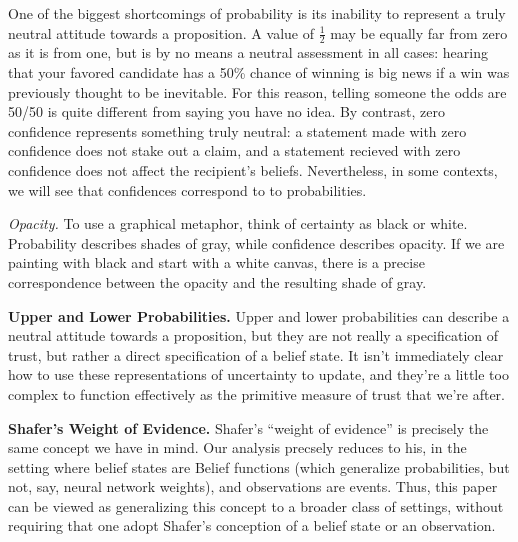 One of the biggest shortcomings of probability is its inability to represent a truly neutral attitude towards a proposition.
A value of $\frac12$ may be equally far from zero as it is from one, but is by no means a neutral assessment in all cases: hearing that your favored candidate has a 50\% chance of winning is big news if a win was previously thought to be inevitable.
For this reason, telling someone the odds are 50/50 is quite different from saying you have no idea.
By contrast, zero confidence represents something truly neutral:
	a statement made with zero confidence does not stake out a claim, and
	a statement recieved with zero confidence does not affect the recipient's beliefs.
Nevertheless, in some contexts, we will see that confidences correspond to to probabilities.

\textit{Opacity.} To use a graphical metaphor, think of certainty as black or white.
Probability describes shades of gray, while confidence describes opacity.
If we are painting with black and start with a white canvas, there is a precise correspondence between the opacity and the resulting shade of gray.

\textbf{Upper and Lower Probabilities.}
Upper and lower probabilities can describe a neutral attitude towards a proposition, but they are not really a specification of trust, but rather a direct specification of a belief state.
It isn't immediately clear how to use these representations of uncertainty to update, and they're a little too complex to function effectively as the primitive measure of trust that we're after.


\textbf{Shafer's Weight of Evidence.}
Shafer's ``weight of evidence'' is precisely the same concept we have in mind.
Our analysis precsely reduces to his, in the setting where belief states are Belief functions (which generalize probabilities, but not, say, neural network weights), and observations are events.
Thus, this paper can be viewed as generalizing this concept to a broader class of settings, without requiring that one adopt Shafer's conception of a belief state or an observation.


